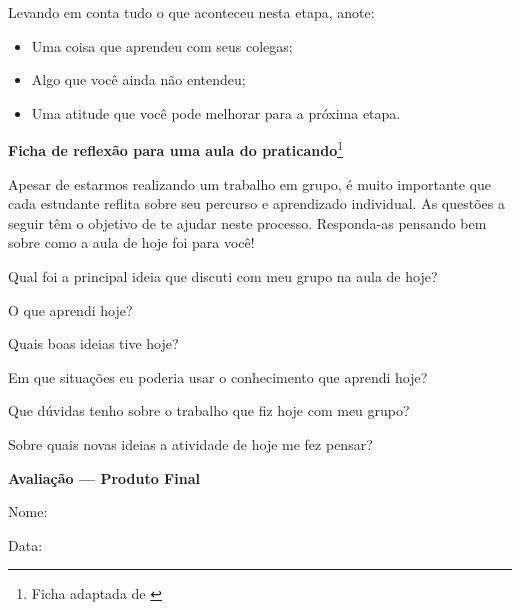 Levando em conta tudo o que aconteceu nesta etapa, anote:
\begin{itemize}[itemsep=4em]
\item Uma coisa que aprendeu com seus colegas;
\item Algo que você ainda não entendeu;
\item Uma atitude que você pode melhorar para a próxima etapa.
\end{itemize}
\cleardoublepage

\centering
\textbf{\Large\color{\currentcolor} Ficha de reflexão para uma aula do praticando}\footnote{Ficha adaptada de \citet{boaler2018}}
\justify

Apesar de estarmos realizando um trabalho em grupo, é muito importante que cada estudante reflita sobre seu percurso e aprendizado individual. As questões a seguir têm o objetivo de te ajudar neste processo. Responda-as pensando bem sobre como a aula de hoje foi para você!

{\noindent Qual foi a principal ideia que discuti com meu grupo na aula de hoje?
\setlength\parskip{6em}

\noindent O que aprendi hoje?

\noindent Quais boas ideias tive hoje?

\noindent Em que situações eu poderia usar o conhecimento que aprendi hoje?

\noindent Que dúvidas tenho sobre o trabalho que fiz hoje com meu grupo?

\noindent Sobre quais novas ideias a atividade de hoje me fez pensar?
}

\cleardoublepage

\centering
\textbf{\Large\color{\currentcolor} Avaliação --- Produto Final}
\vspace{3em}

\flushleft
Nome:\makebox[20em]{\hrulefill}

Data:\makebox[10em]{\hrulefill}

\vspace{5em}
\justify
\begin{figure}[H]
\centering

\end{figure}


